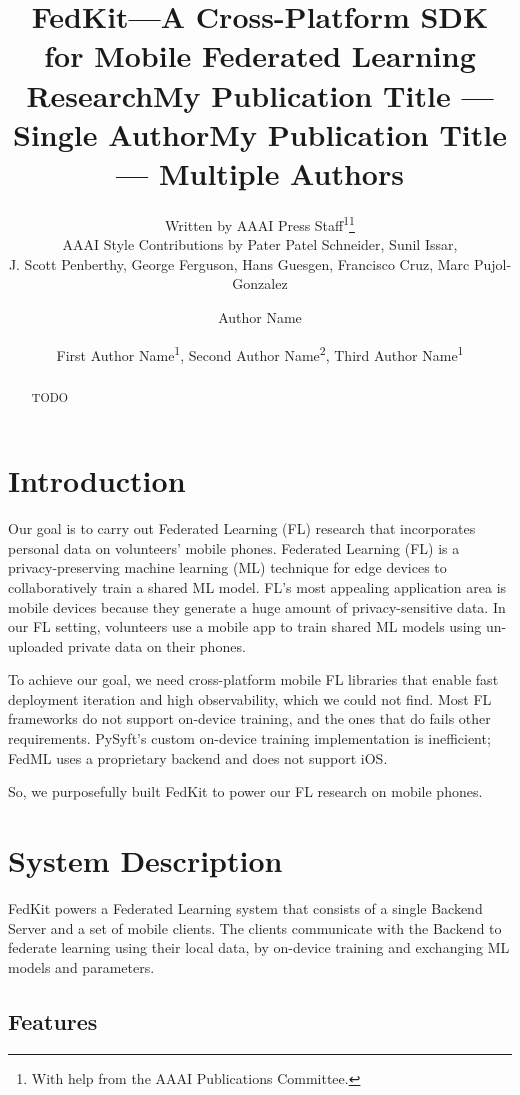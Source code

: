 \documentclass[letterpaper]{article} %
\title{FedKit---A Cross-Platform SDK for Mobile Federated Learning Research}
\author{
    Written by AAAI Press Staff\textsuperscript{\rm 1}\thanks{With help from the AAAI Publications Committee.}\\
    AAAI Style Contributions by Pater Patel Schneider,
    Sunil Issar,\\
    J. Scott Penberthy,
    George Ferguson,
    Hans Guesgen,
    Francisco Cruz\equalcontrib,
    Marc Pujol-Gonzalez\equalcontrib
}
\title{My Publication Title --- Single Author}
\author {
    Author Name
}
\title{My Publication Title --- Multiple Authors}
\author {
    First Author Name\textsuperscript{\rm 1},
    Second Author Name\textsuperscript{\rm 2},
    Third Author Name\textsuperscript{\rm 1}
}
\begin{document}
\maketitle

\begin{abstract}
    TODO
\end{abstract}

\section{Introduction}

Our goal is to carry out Federated Learning (FL) research that incorporates
personal data on volunteers' mobile phones.
Federated Learning (FL) is a privacy-preserving machine learning (ML) technique
for edge devices to collaboratively train a shared ML model.
FL's most appealing application area is mobile devices because
they generate a huge amount of privacy-sensitive data.
In our FL setting,
volunteers use a mobile app to train shared ML models
using un-uploaded private data on their phones.

To achieve our goal, we need cross-platform mobile FL libraries that
enable fast deployment iteration and high observability,
which we could not find.
Most FL frameworks do not support on-device training,
and the ones that do fails other requirements. %
PySyft's \cite{ryffel2018generic,Ziller2021,hall2021syft}
custom on-device training implementation is inefficient;
FedML \cite{he2020fedml} uses a proprietary backend and does not support iOS.

So, we purposefully built FedKit to power our FL research on mobile phones.

\section{System Description}

\newcommand{\model}{$M$}
\newcommand{\fs}{$S_F$}

FedKit powers a Federated Learning system that
consists of a single Backend Server and a set of mobile clients.
The clients communicate with the Backend to federate learning
using their local data,
by on-device training and exchanging ML models and parameters.

\subsection{Features}
\end{document}
